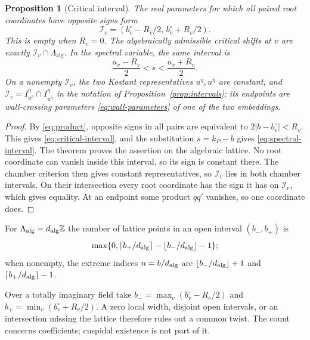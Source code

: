 \documentclass[12pt]{amsart}
\numberwithin{equation}{section}
\theoremstyle{plain}
\newtheorem{proposition}[theorem]{Proposition}
\theoremstyle{definition}
\theoremstyle{remark}
\renewcommand{\bar}{\overline}
\newcommand{\Z}{\mathbb{Z}}
\begin{document}
\begin{proposition}[Critical interval]\label{prop:interval}
The real parameters for which all paired root coordinates have opposite signs form
\begin{equation}\label{eq:critical-interval}
 \mathcal I_v=(b_v^\circ-R_v/2,\,b_v^\circ+R_v/2).
\end{equation}
This is empty when $R_v=0$. The algebraically admissible critical shifts at $v$ are exactly $\mathcal I_v\cap\Lambda_{\mathrm{alg}}$. In the spectral variable, the same interval is 
\begin{equation}\label{eq:spectral-interval}
 \frac{a_v-R_v}{2}<s<\frac{a_v+R_v}{2}.
\end{equation}
On a nonempty $\mathcal I_v$, the two Kostant representatives $u^\eta,u^{\bar\eta}$ are constant, and $\mathcal I_v=I^\eta_{u^\eta}\cap I^{\bar\eta}_{u^{\bar\eta}}$ in the notation of Proposition~\ref{prop:intervals}; its endpoints are wall-crossing parameters \eqref{eq:wall-parameters} of one of the two embeddings. 
\end{proposition}

\begin{proof}
By \eqref{eq:product}, opposite signs in all pairs are equivalent to $2|b-b_v^\circ|<R_v$. This gives \eqref{eq:critical-interval}, and the substitution $s=k_P-b$ gives \eqref{eq:spectral-interval}. The theorem proves the assertion on the algebraic lattice. No root coordinate can vanish inside this interval, so its sign is constant there. The chamber criterion then gives constant representatives, so $\mathcal I_v$ lies in both chamber intervals. On their intersection every root coordinate has the sign it has on $\mathcal I_v$, which gives equality. At an endpoint some product $qq'$ vanishes, so one coordinate does.
\end{proof}

For $\Lambda_{\rm alg}=d_{\rm alg}\Z$ the number of lattice points in an open interval $(b_-,b_+)$ is 
\[
 \max\{0,\lceil b_+/d_{\rm alg}\rceil-\lfloor b_-/d_{\rm alg}\rfloor-1\};
\]
when nonempty, the extreme indices $n=b/d_{\rm alg}$ are $\lfloor b_-/d_{\rm alg}\rfloor+1$ and $\lceil b_+/d_{\rm alg}\rceil-1$.

Over a totally imaginary field take $b_-=\max_v(b_v^\circ-R_v/2)$ and $b_+=\min_v(b_v^\circ+R_v/2)$. A zero local width, disjoint open intervals, or an intersection missing the lattice therefore rules out a common twist. The count concerns coefficients; cuspidal existence is not part of it.
\end{document}
